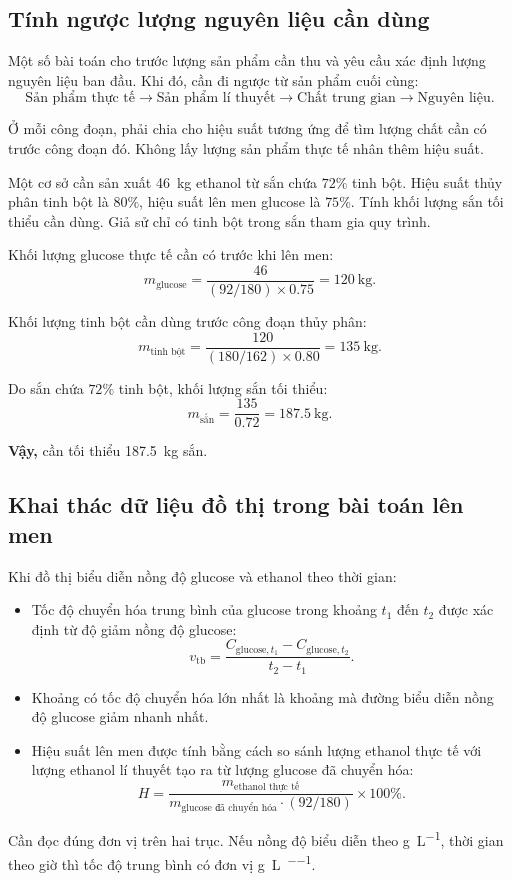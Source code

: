 \subsection{Tính ngược lượng nguyên liệu cần dùng}

Một số bài toán cho trước lượng sản phẩm cần thu và yêu cầu xác định lượng nguyên liệu ban đầu. Khi đó, cần đi ngược từ sản phẩm cuối cùng:
\[
\text{Sản phẩm thực tế}
\longrightarrow\text{Sản phẩm lí thuyết}
\longrightarrow\text{Chất trung gian}
\longrightarrow\text{Nguyên liệu}.
\]

Ở mỗi công đoạn, phải chia cho hiệu suất tương ứng để tìm lượng chất cần có trước công đoạn đó. Không lấy lượng sản phẩm thực tế nhân thêm hiệu suất.

\begin{vidu}
Một cơ sở cần sản xuất \SI{46}{\kilo\gram} ethanol từ sắn chứa $72\%$ tinh bột. Hiệu suất thủy phân tinh bột là $80\%$, hiệu suất lên men glucose là $75\%$. Tính khối lượng sắn tối thiểu cần dùng. Giả sử chỉ có tinh bột trong sắn tham gia quy trình.
\end{vidu}
\begin{loigiai}
Khối lượng glucose thực tế cần có trước khi lên men:
\[
m_{\text{glucose}}
=\frac{46}{(92/180)\times0.75}
=\SI{120}{\kilo\gram}.
\]

Khối lượng tinh bột cần dùng trước công đoạn thủy phân:
\[
m_{\text{tinh bột}}
=\frac{120}{(180/162)\times0.80}
=\SI{135}{\kilo\gram}.
\]

Do sắn chứa $72\%$ tinh bột, khối lượng sắn tối thiểu:
\[
m_{\text{sắn}}=\frac{135}{0.72}
=\SI{187.5}{\kilo\gram}.
\]

\textbf{Vậy,} cần tối thiểu \SI{187.5}{\kilo\gram} sắn.
\end{loigiai}

\subsection{Khai thác dữ liệu đồ thị trong bài toán lên men}

Khi đồ thị biểu diễn nồng độ glucose và ethanol theo thời gian:
\begin{itemize}
\item Tốc độ chuyển hóa trung bình của glucose trong khoảng $t_1$ đến $t_2$ được xác định từ độ giảm nồng độ glucose:
\[
v_{\text{tb}}=\frac{C_{\text{glucose},t_1}-C_{\text{glucose},t_2}}{t_2-t_1}.
\]
\item Khoảng có tốc độ chuyển hóa lớn nhất là khoảng mà đường biểu diễn nồng độ glucose giảm nhanh nhất.
\item Hiệu suất lên men được tính bằng cách so sánh lượng ethanol thực tế với lượng ethanol lí thuyết tạo ra từ lượng glucose đã chuyển hóa:
\[
H=\frac{m_{\text{ethanol thực tế}}}
{m_{\text{glucose đã chuyển hóa}}\cdot(92/180)}
\times100\%.
\]
\end{itemize}

Cần đọc đúng đơn vị trên hai trục. Nếu nồng độ biểu diễn theo \si{\gram\per\liter}, thời gian theo giờ thì tốc độ trung bình có đơn vị \si{\gram\per\liter\per\hou}.
